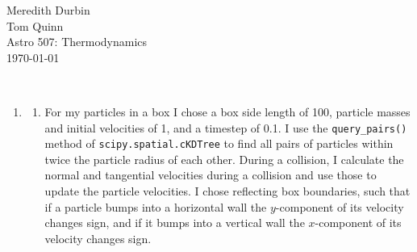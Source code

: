 \documentclass[11pt]{article}
\begin{document}
\begin{flushright}Meredith Durbin\\
Tom Quinn\\
Astro 507: Thermodynamics\\
\today\\

\end{flushright}

 \\[6pt]

\begin{enumerate}

\item
    \begin{enumerate}
    \item %
    For my particles in a box I chose a box side length of 100, particle masses and initial velocities of 1, and a timestep of 0.1. I use the \texttt{query\_pairs()} method of \texttt{scipy.spatial.cKDTree} to find all pairs of particles within twice the particle radius of each other. During a collision, I calculate the normal and tangential velocities during a collision and use those to update the particle velocities. I chose reflecting box boundaries, such that if a particle bumps into a horizontal wall the $y$-component of its velocity changes sign, and if it bumps into a vertical wall the $x$-component of its velocity changes sign.
    

\end{enumerate}
\end{enumerate}
\end{document}
